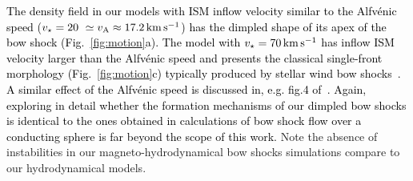 \documentclass[useAMS,usenatbib]{mn2e}
\begin{document}
\textcolor{black}{
The density field in our models with ISM inflow 
velocity similar to the \textcolor{black}{Alfv\' enic} speed ($v_{\star}=20 
~\simeq v_{\rm A}\approx 17.2\, \rm km\, \rm s^{-1}$) has the dimpled shape 
of its apex of the bow shock (Fig.~\ref{fig:motion}a). 
The model with $v_{\star}=70\, \rm km\, \rm s^{-1}$ has inflow ISM velocity 
larger than the \textcolor{black}{Alfv\' enic} speed and presents the classical single-front 
morphology (Fig.~\ref{fig:motion}c) typically produced by stellar wind bow 
shocks~\citep{brighenti_mnras_273_1995,brighenti_mnras_277_1995,comeron_aa_338_1998,meyer_mnras_459_2016}. 
A similar effect of the \textcolor{black}{Alfv\' enic} speed is discussed in, e.g. fig.4 of~\citet{sterck_aa_343_1999}. 
Again, exploring in detail whether the formation mechanisms of our dimpled bow shocks 
is identical to the ones obtained in calculations of 
bow shock flow over a conducting sphere is far beyond the scope of this work. }
Note the absence of instabilities in our magneto-hydrodynamical bow shocks simulations 
compare to our hydrodynamical models. 





\end{document}
